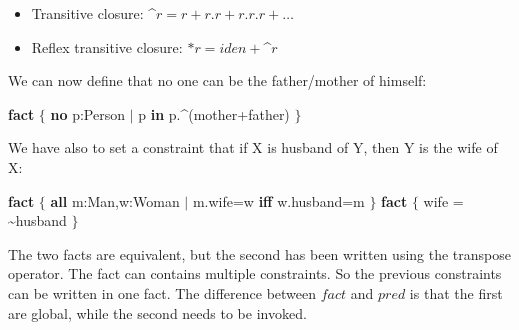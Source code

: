 \documentclass[12pt, a4paper]{report}
\newtheorem[style=M,bodystyle=\normalfont]{theorem}{Theorem}
\newtheorem[style=M,bodystyle=\normalfont]{corollary}{Corollary}
\newtheorem[style=M,bodystyle=\normalfont]{lemma}{Lemma}
\newtheorem[style=M,bodystyle=\normalfont]{definition}{Definition}
\begin{document}
        \begin{itemize}
            \item Transitive closure: \textasciicircum $r=r+r.r+r.r.r+\dots$
            \item Reflex transitive closure: $*r=iden+$\textasciicircum$r$
        \end{itemize}
        We can now define that no one can be the father/mother of himself: 
        \begin{algorithmic}[H]
            \State \textbf{fact} $\{$
            \State \:\:\:\:\:\:\:\: \textbf{no} p:Person $\mid$ p \textbf{in} p.\textasciicircum(mother+father)
            \State $\}$
        \end{algorithmic} 
        We have also to set a constraint that if X is husband of Y, then Y is the wife of X:
        \begin{algorithmic}[H]
            \State \textbf{fact} $\{$
            \State \:\:\:\:\:\:\:\: \textbf{all} m:Man,w:Woman $\mid$ m.wife=w \textbf{iff} w.husband=m
            \State $\}$
            \State \textbf{fact} $\{$
            \State \:\:\:\:\:\:\:\: wife = \textasciitilde husband
            \State $\}$
        \end{algorithmic} 
        The two facts are equivalent, but the second has been written using the transpose operator. The fact can contains multiple constraints. So the previous constraints can be written 
        in one fact. The difference between $fact$ and $pred$ is that the first are global, while the second needs to be invoked.
    
    \newpage




    

    
\end{document}
